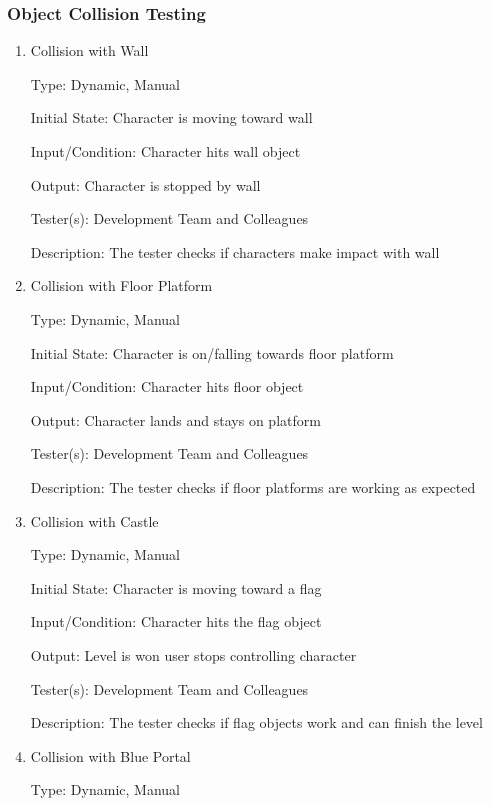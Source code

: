 \documentclass[12pt, titlepage]{article}
\begin{document}
\subsubsection{Object Collision Testing}

\begin{enumerate}

\item{Collision with Wall\\}

Type: Dynamic, Manual

Initial State: Character is moving toward wall

Input/Condition: Character hits wall object

Output: Character is stopped by wall

Tester(s): Development Team and Colleagues

Description: The tester checks if characters make impact with wall


\item{Collision with Floor Platform\\}

Type: Dynamic, Manual

Initial State: Character is on/falling towards floor platform

Input/Condition: Character hits floor object

Output: Character lands and stays on platform

Tester(s): Development Team and Colleagues

Description: The tester checks if floor platforms are working as expected


\item{Collision with Castle\\}

Type: Dynamic, Manual

Initial State: Character is moving toward a flag

Input/Condition: Character hits the flag object

Output: Level is won user stops controlling character

Tester(s): Development Team and Colleagues

Description: The tester checks if flag objects work and can finish the level


\item{Collision with Blue Portal\\}

Type: Dynamic, Manual


\end{enumerate}
\end{document}
